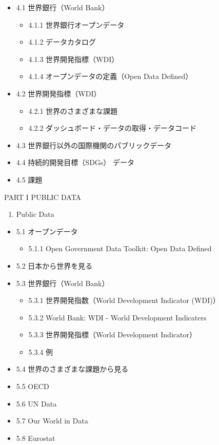 \documentclass[
  xelatex, ja=standard]{bxjsbook}
\providecommand{\tightlist}{%
  \setlength{\itemsep}{0pt}\setlength{\parskip}{0pt}}
\theoremstyle{definition}
\theoremstyle{definition}
\theoremstyle{definition}
\theoremstyle{definition}
\theoremstyle{remark}
\begin{document}
\begin{itemize}
\tightlist
\item
  4.1 世界銀行（World Bank）

  \begin{itemize}
  \tightlist
  \item
    4.1.1 世界銀行オープンデータ
  \item
    4.1.2 データカタログ
  \item
    4.1.3 世界開発指標（WDI）
  \item
    4.1.4 オープンデータの定義（Open Data Defined）
  \end{itemize}
\item
  4.2 世界開発指標（WDI）

  \begin{itemize}
  \tightlist
  \item
    4.2.1 世界のさまざまな課題
  \item
    4.2.2 ダッシュボード・データの取得・データコード
  \end{itemize}
\item
  4.3 世界銀行以外の国際機関のパブリックデータ
\item
  4.4 持続的開発目標（SDGs） データ
\item
  4.5 課題
\end{itemize}

PART I PUBLIC DATA

\begin{enumerate}
\def\labelenumi{\arabic{enumi}.}
\setcounter{enumi}{10}
\tightlist
\item
  Public Data
\end{enumerate}

\begin{itemize}
\tightlist
\item
  5.1 オープンデータ

  \begin{itemize}
  \tightlist
  \item
    5.1.1 Open Government Data Toolkit: Open Data Defined
  \end{itemize}
\item
  5.2 日本から世界を見る
\item
  5.3 世界銀行（World Bank）

  \begin{itemize}
  \tightlist
  \item
    5.3.1 世界開発指数（World Development Indicator (WDI)）
  \item
    5.3.2 World Bank: WDI - World Development Indicaters
  \item
    5.3.3 世界開発指標（World Development Indicator）
  \item
    5.3.4 例
  \end{itemize}
\item
  5.4 世界のさまざまな課題から見る
\item
  5.5 OECD
\item
  5.6 UN Data
\item
  5.7 Our World in Data
\item
  5.8 Eurostat
\end{itemize}
\end{document}
